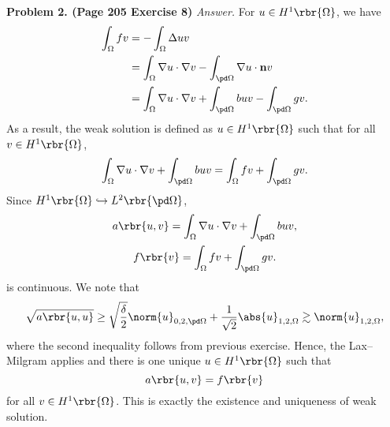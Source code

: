 \documentclass[english, nochinese]{pnote}
\begin{document}
\textbf{Problem 2. (Page 205 Exercise 8)} \textit{Answer.} For $ u \in H^1 \rbr{\Omega} $, we have
\begin{equation}
\begin{split}
\int_{\Omega} f v &= -\int_{\Omega} \Delta u v \\
&= \int_{\Omega} \nabla u \cdot \nabla v - \int_{ \pd \Omega } \nabla u \cdot \mathbf{n} v \\
&= \int_{\Omega} \nabla u \cdot \nabla v + \int_{ \pd \Omega } b u v - \int_{ \pd \Omega } g v.
\end{split}
\end{equation}
As a result, the weak solution is defined as $ u \in H^1 \rbr{\Omega} $ such that for all $ v \in H^1 \rbr{\Omega} $,
\begin{equation}
\int_{\Omega} \nabla u \cdot \nabla v + \int_{ \pd \Omega } b u v = \int_{\Omega} f v + \int_{ \pd \Omega } g v.
\end{equation}
Since $ H^1 \rbr{\Omega} \hookrightarrow L^2 \rbr{ \pd \Omega } $,
\begin{gather}
a \rbr{ u, v } = \int_{\Omega} \nabla u \cdot \nabla v + \int_{ \pd \Omega } b u v, \\
f \rbr{v} = \int_{\Omega} f v + \int_{ \pd \Omega } g v.
\end{gather}
is continuous. We note that
\begin{equation}
\sqrt{ a \rbr{ u, u } } \ge \sqrt{\frac{\delta}{2}} \norm{u}_{ 0, 2, \pd \Omega } + \frac{1}{\sqrt{2}} \abs{u}_{ 1, 2, \Omega } \gtrsim \norm{u}_{ 1, 2, \Omega },
\end{equation}
where the second inequality follows from previous exercise. Hence, the Lax--Milgram applies and there is one unique $ u \in H^1 \rbr{\Omega} $ such that
\begin{equation}
a \rbr{ u, v } = f \rbr{v}
\end{equation}
for all $ v \in H^1 \rbr{\Omega} $. This is exactly the existence and uniqueness of weak solution.
\end{document}
